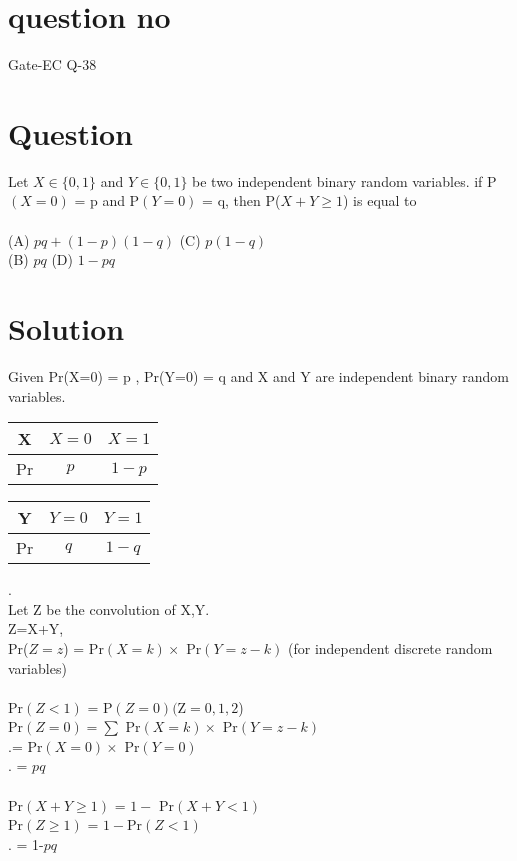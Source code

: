 \documentclass[journal,12pt,twocolumn]{IEEEtran}
\begin{document}
\section*{question no}
Gate-EC Q-38
\section*{Question}
Let  $X\in \{ 0,1 \}$ and $Y\in \{ 0,1 \}$ be two independent binary random variables. if P$(X=0)$ = p and  P$(Y=0)$ = q, then P($X+Y \geqslant 1$) is equal to\\\\
(A) $pq+(1-p)(1-q)$   \hfill (C) $p(1-q)$ \\
(B) $pq$     \hfill   (D)  $1-pq$ \\
\section*{Solution}
 Given Pr(X=0) = p , Pr(Y=0) = q and  X and Y are independent binary random variables.\\
 \begin{center}
 \begin{tabular}{| c| c| c| }
  \hline
 X & $X=0$ & $X=1$\\ 
 \hline
Pr &$p$ & $1-p$ \\  
 \hline
\end{tabular}\hfill
\begin{tabular}{| c| c| c| }
  \hline
 Y & $Y=0$ & $Y=1$\\ 
 \hline
Pr &$q$ & $1-q$ \\  
 \hline
\end{tabular}
 \end{center}
 .\\
Let Z be the convolution of X,Y.\\
  Z=X+Y,\\
  Pr($Z = z$) = \sum Pr$(X = k) \times$ Pr$(Y = z-k)$
  (for independent discrete random variables)\\\\
  Pr$(Z<1)$ = P$(Z=0)($Z$={0,1,2}$)\\
  Pr$(Z=0)=\sum$ Pr$(X = k)\times$ Pr$(Y = z-k)$\\
 .\hspace{1.63cm}= Pr$(X = 0) \times$ Pr$(Y = 0)$\\
.\hspace{1.5cm} = $pq$\\\\
  Pr$(X+Y\geq1)$ = $1 -$ Pr$(X+Y<1)$\\
  Pr$(Z\geq1)$\hspace{0.75cm} = $1-$Pr$(Z<1)$\\
  .\hspace{2.27cm} = 1-$pq$\\
              
\end{document}

